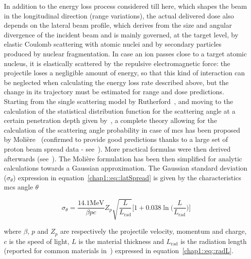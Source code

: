 In addition to the energy loss process considered till here,   which shapes the beam in the longitudinal direction (range variations), the actual delivered dose also depends on the lateral beam profile, which derives from the size and angular divergence of the incident beam and is mainly governed, at the target level, by elastic Coulomb scattering with atomic nuclei and by secondary particles produced by nuclear fragmentation. 
In case an ion passes close to a target atomic nucleus, it is elastically scattered by the repulsive electromagnetic force: the projectile loses a negligible amount of energy, so that this kind of interaction can be neglected when calculating the energy loss rate described above, but the change in its trajectory must be estimated for range and dose predictions. %
Starting from the single scattering model by Rutherford~\parencite{Rutherford1911}, and moving to the calculation of the statistical distribution function for the scattering angle at a certain penetration depth given by~\cite{Bothe1921}, a complete theory allowing for the calculation of the scattering angle probability in case of \gls{mcs} has been proposed by Moli\`{e}re~\parencite{Moliere1948} (confirmed to provide good predictions thanks to a large set of proton beam spread data - see~\cite{Gottschalk1993}). More practical formulas were then derived afterwards (see~\cite{Lewis1950, Highland1975, Gottschalk2010}). The Moli\`{e}re formulation has been then simplified for analytic calculations towards a Gaussian approximation. The Gaussian standard deviation ($\sigma_{\theta}$) expression in equation~\ref{chap1::eq::latSpread} is given by the characteristics \gls{mcs} angle $\theta$~\parencite{Highland1975}

\begin{equation}
\sigma_{\theta} = \frac{14.1 \mathrm{MeV}}{\beta p c}Z_{p}\sqrt{\frac{L}{L_\mathrm{rad}}}\big[1+0.038 \ln\big(\frac{L}{L_{\mathrm{rad}}}\big) \big]
\label{chap1::eq::latSpread}
\end{equation}

where $\beta$, $p$ and $Z_{p}$ are respectively the projectile velocity, momentum and charge, $c$ is the speed of light,  $L$ is the material thickness and $L_{\mathrm{rad}}$ is the radiation length (reported for common materials in~\cite{Tsai1974}) expressed in equation~\ref{chap1::eq::radL}. 

